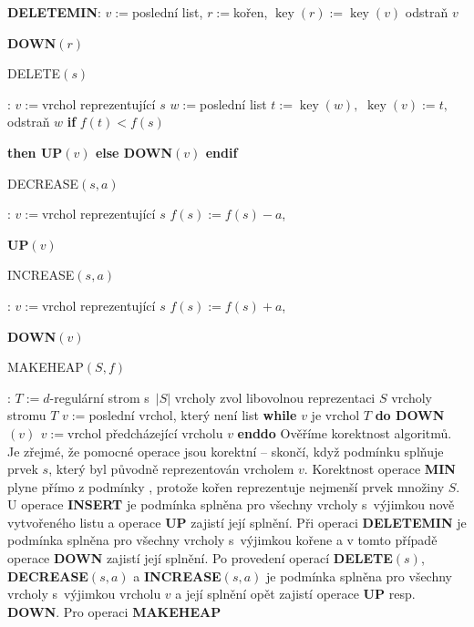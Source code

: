 \documentclass[a4paper,12pt]{article}
\DeclareMathOperator*{\key}{key}
\begin{document}
{\bf DELETEMIN}:\newline 
$v:=$poslední list, $r:=$kořen, $\key(r):=\key(v)$\newline 
odstraň $v$\newline 
{\bf DOWN$(r)$

DELETE$(s)$}:\newline 
$v:=$vrchol reprezentující $s$\newline 
$w:=$poslední list\newline 
$t:=\key(w),$ $\key(v):=t,$ odstraň $w$\newline 
{\bf if} $f(t)<f(s)$ {\bf then UP$(v)$ else DOWN$(v)$ endif

DECREASE$(s,a)$}:\newline 
$v:=$vrchol reprezentující $s$\newline 
$f(s):=f(s)-a$, {\bf UP$(v)$

INCREASE$(s,a)$}:\newline 
$v:=$vrchol reprezentující $s$\newline 
$f(s):=f(s)+a$, {\bf DOWN$(v)$

MAKEHEAP$(S,f)$}:\newline 
$T:=d$-regulární strom s~$|S|$ vrcholy\newline 
zvol libovolnou reprezentaci $S$ vrcholy stromu $T$\newline 
$v:=$poslední vrchol, který není list\newline 
{\bf while} $v$ je vrchol $T$ {\bf do\newline 
\phantom{{\rm ---}}DOWN$(v)$\newline 
\phantom{{\rm ---}}$v:=$}vrchol předcházející 
vrcholu $v$\newline 
{\bf enddo
}
Ověříme korektnost algoritmů.  Je zřejmé, že 
pomocné operace jsou korektní -- skončí, když podmínku 
 splňuje prvek $s$, který byl původně 
reprezentován vrcholem $v$. Korektnost operace {\bf MIN} plyne 
přímo z podmínky , protože kořen reprezentuje nejmenší 
prvek množiny $S$. U operace {\bf INSERT} je podmínka 
 splněna pro všechny vrcholy s~výjimkou nově 
vytvořeného listu a operace {\bf UP} zajistí její splnění.  Při 
operaci {\bf DELETEMIN} je pod\-mín\-ka  splněna pro 
všechny vrcholy s~výjimkou kořene a v tomto případě ope\-race {\bf DOWN} zajistí 
její splnění.  Po provedení operací {\bf DE\-LE\-TE$
(s)$}, {\bf DECREASE$(s,a)$ }
a {\bf INCREASE$(s,a)$} je pod\-mín\-ka  splněna pro 
všechny vrcholy s~výjimkou vrcholu $v$ a její splnění 
opět zajistí operace {\bf UP }
resp. {\bf DOWN}.  Pro operaci {\bf MAKEHEAP }
\end{document}
